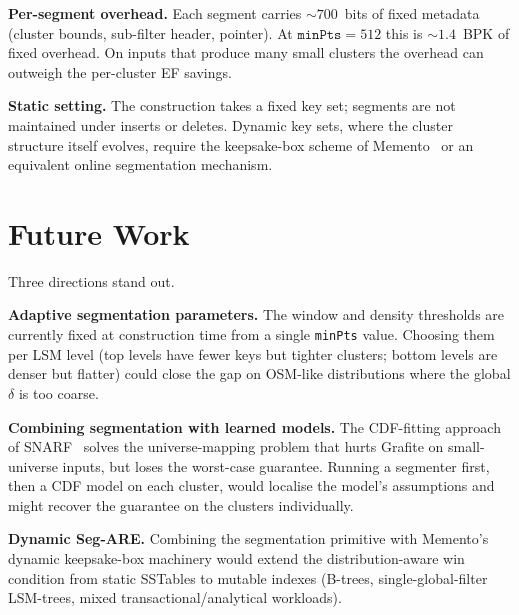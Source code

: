 \textbf{Per-segment overhead.} Each segment carries $\sim\!700$~bits
of fixed metadata (cluster bounds, sub-filter header, pointer). At
$\texttt{minPts} = 512$ this is $\sim\!1.4$~BPK of fixed overhead. On
inputs that produce many small clusters the overhead can outweigh the
per-cluster EF savings.

\textbf{Static setting.} The construction takes a fixed key set;
segments are not maintained under inserts or deletes. Dynamic key
sets, where the cluster structure itself evolves, require the
keepsake-box scheme of Memento~\citep{eslami2024memento} or an
equivalent online segmentation mechanism.

\section{Future Work}
\label{sec:conclusion-future}

Three directions stand out.

\textbf{Adaptive segmentation parameters.} The window and density
thresholds are currently fixed at construction time from a single
\texttt{minPts} value.
Choosing them per LSM level (top levels have
fewer keys but tighter clusters; bottom levels are denser but flatter)
could close the gap on OSM-like distributions where the global
$\delta$ is too coarse.

\textbf{Combining segmentation with learned models.}
The CDF-fitting approach of SNARF~\citep{vaidya2022snarf} solves the universe-mapping
problem that hurts Grafite on small-universe inputs, but loses the
worst-case guarantee. Running a segmenter first, then a CDF model on
each cluster, would localise the model's assumptions and might recover
the guarantee on the clusters individually.

\textbf{Dynamic Seg-ARE.} Combining the segmentation primitive with
Memento's dynamic keepsake-box machinery would extend the
distribution-aware win condition from static SSTables to mutable
indexes (B-trees, single-global-filter LSM-trees, mixed
transactional/analytical workloads).
